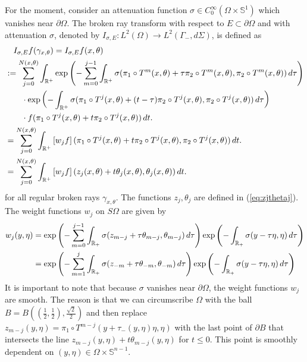\documentclass[10pt]{amsart}
\theoremstyle{definition}
\theoremstyle{definition}
\theoremstyle{definition}
\newcommand{ \rn }[1]{\mathbb{R}^{#1}}
\begin{document}
For the moment, consider an attenuation function $\sigma \in C_{0}^{\infty}(\Omega \times \mathbb{S}^{1})$ which vanishes near $\partial \Omega$. The broken ray transform with respect to $E\subset \partial \Omega$ and with attenuation $\sigma$, denoted by $I_{\sigma, E}:L^{2}(\Omega) \to L^{2}(\Gamma_{-}, d\Sigma)$, is defined as
\begin{align}
& \quad I_{\sigma, E}f(\gamma_{x,\theta}) = I_{\sigma, E}f(x,\theta) \notag \\
& := \sum_{j=0}^{N(x,\theta)}\int_{\rn{+}} \exp\left( - \sum_{m=0}^{j-1}\int_{\rn{+}}\sigma(\pi_{1} \circ T^{m}(x,\theta) + \tau \pi_{2}\circ T^{m}(x,\theta), \pi_{2} \circ T^{m}(x,\theta))\,d\tau\right) \notag\\
& \qquad \cdot \exp\left(-\int_{\rn{+}}\sigma(\pi_{1}\circ T^{j}(x,\theta) + (t-\tau)\pi_{2}\circ T^{j}(x,\theta), \pi_{2} \circ T^{j}(x,\theta) )\,d\tau\right) \notag \\
& \qquad \cdot f(\pi_{1} \circ T^{j}(x,\theta) + t \pi_{2}\circ T^{j}(x,\theta))\,dt. \label{forwardoperator}\\
& = \sum_{j=0}^{N(x,\theta)}\int_{\rn{+}} \left[w_{j}f\right](\pi_{1} \circ T^{j}(x,\theta) + t \pi_{2}\circ T^{j}(x,\theta), \pi_{2}\circ T^{j}(x,\theta))\,dt. \notag\\
& = \sum_{j=0}^{N(x,\theta)}\int_{\rn{+}} \left[w_{j}f\right](z_{j}(x,\theta) + t \theta_{j}(x,\theta), \theta_{j}(x,\theta))\,dt. \notag
\end{align}
for all regular broken rays $\gamma_{x,\theta}$. The functions $z_{j}, \theta_{j}$ are defined in (\ref{eq:zjthetaj}). The weight functions $w_{j}$ on $S\Omega$ are given by
\begin{align}
w_{j}(y,\eta) & = \exp\left( -\sum_{m=0}^{j-1} \int_{\mathbb{R}_{+}}\sigma( z_{m-j}+\tau \theta_{m-j},\theta_{m-j})\,d\tau\right) \exp\left( -\int_{\mathbb{R}_{+}}\sigma(y - \tau \eta, \eta)\,d\tau \right)\notag\\
& = \exp\left( -\sum_{m=1}^{j} \int_{\mathbb{R}_{+}}\sigma( z_{-m}+\tau \theta_{-m},\theta_{-m})\,d\tau\right) \exp\left( -\int_{\mathbb{R}_{+}}\sigma(y - \tau \eta, \eta)\,d\tau \right)\notag
\end{align}
It is important to note that because $\sigma$ vanishes near $\partial \Omega$, the weight functions $w_{j}$ are smooth. The reason is that we can circumscribe $\Omega$ with the ball $B = B\left( \left( \frac{1}{2}, \frac{1}{2} \right), \frac{\sqrt{2}}{2} \right)$ and then replace $z_{m-j}(y,\eta) = \pi_{1} \circ T^{m-j}(y+ \tau_{-}(y,\eta)\eta,\eta)$ with the last point of $\partial B$ that intersects the line $z_{m-j}(y,\eta) + t\theta_{m-j}(y,\eta)$ for $t \leq 0$. This point is smoothly dependent on $(y,\eta) \in \Omega \times \mathbb{S}^{n-1}$. 
\end{document}
